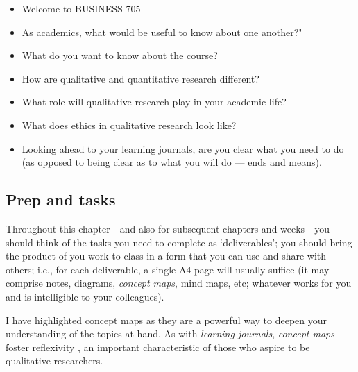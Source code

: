 \documentclass[]{book}
\theoremstyle{definition}
\theoremstyle{definition}
\theoremstyle{definition}
\theoremstyle{remark}
\begin{document}
\begin{itemize}
\item
  Welcome to BUSINESS 705
\item
  As academics, what would be useful to know about one another?"
\item
  What do you want to know about the course?
\item
  How are qualitative and quantitative research different?
\item
  What role will qualitative research play in your academic life?
\item
  What does ethics in qualitative research look like?
\item
  Looking ahead to your learning journals, are you clear what you need
  to do (as opposed to being clear as to what you will do --- ends and
  means).
\end{itemize}

\hypertarget{prep-and-tasks}{%
\subsection*{Prep and tasks}\label{prep-and-tasks}}

Throughout this chapter---and also for subsequent chapters and
weeks---you should think of the tasks you need to complete as
`deliverables'; you should bring the product of you work to class in a
form that you can use and share with others; i.e., for each deliverable,
a single A4 page will usually suffice (it may comprise notes, diagrams,
\emph{concept maps}, mind maps, etc; whatever works for you and is
intelligible to your colleagues).

I have highlighted concept maps as they are a powerful way to deepen
your understanding of the topics at hand. As with \emph{learning
journals}, \emph{concept maps} foster reflexivity
\autocite{hibbert_2010_reflexivityrecursionrelationality}, an important
characteristic of those who aspire to be qualitative researchers.
\end{document}
